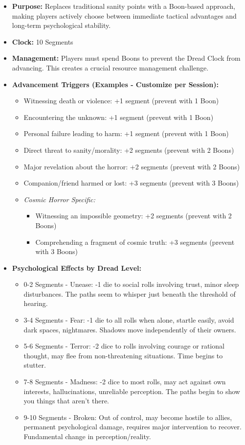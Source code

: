 \documentclass[11pt]{article}
\begin{document}
\begin{itemize}
\item \textbf{Purpose:} Replaces traditional sanity points with a Boon-based approach, making players actively choose between immediate tactical advantages and long-term psychological stability.
\item \textbf{Clock:} 10 Segments
\item \textbf{Management:} Players must spend Boons to prevent the Dread Clock from advancing. This creates a crucial resource management challenge.
\item \textbf{Advancement Triggers (Examples - Customize per Session):}
\begin{itemize}
\item Witnessing death or violence: +1 segment (prevent with 1 Boon)
\item Encountering the unknown: +1 segment (prevent with 1 Boon)
\item Personal failure leading to harm: +1 segment (prevent with 1 Boon)
\item Direct threat to sanity/morality: +2 segments (prevent with 2 Boons)
\item Major revelation about the horror: +2 segments (prevent with 2 Boons)
\item Companion/friend harmed or lost: +3 segments (prevent with 3 Boons)
\item \textit{Cosmic Horror Specific:}
\begin{itemize}
\item Witnessing an impossible geometry: +2 segments (prevent with 2 Boons)
\item Comprehending a fragment of cosmic truth: +3 segments (prevent with 3 Boons)
\end{itemize}
\end{itemize}
\item \textbf{Psychological Effects by Dread Level:}
\begin{itemize}
\item 0-2 Segments - Unease: -1 die to social rolls involving trust, minor sleep disturbances. The paths seem to whisper just beneath the threshold of hearing.
\item 3-4 Segments - Fear: -1 die to all rolls when alone, startle easily, avoid dark spaces, nightmares. Shadows move independently of their owners.
\item 5-6 Segments - Terror: -2 dice to rolls involving courage or rational thought, may flee from non-threatening situations. Time begins to stutter.
\item 7-8 Segments - Madness: -2 dice to most rolls, may act against own interests, hallucinations, unreliable perception. The paths begin to show you things that aren't there.
\item 9-10 Segments - Broken: Out of control, may become hostile to allies, permanent psychological damage, requires major intervention to recover. Fundamental change in perception/reality.
\end{itemize}
\end{itemize}
\end{document}
